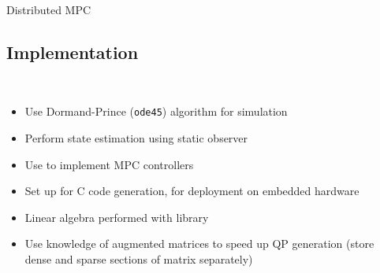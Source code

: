 \begin{frame}{Distributed MPC}
\end{frame}


\subsection{Implementation}
\begin{frame}{~}
  \begin{itemize}
    \item Use Dormand-Prince (\texttt{ode45}) algorithm for simulation
     \item Perform state estimation using static observer
  \end{itemize}

  \begin{itemize}
    \item Use \emlab{} to implement MPC controllers
    \item Set up for C code generation, for deployment on embedded hardware
  \end{itemize}

  \structure{\cpp{}}
  \begin{itemize}
    \item Linear algebra performed with \eigen{} library
    \item Use knowledge of augmented matrices to speed up QP generation (store dense and sparse sections of matrix separately)
  \end{itemize}

\end{frame}



